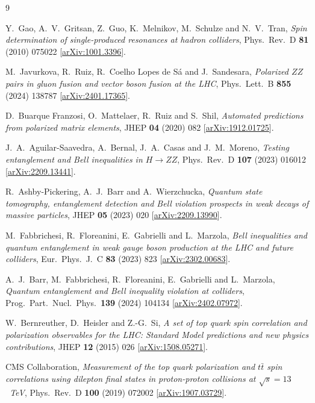 \documentclass[a4paper,11pt]{article}
\begin{document}
\begin{thebibliography}{9}

  Y.~Gao, A.~V.~Gritsan, Z.~Guo, K.~Melnikov, M.~Schulze and N.~V.~Tran,
  \emph{Spin determination of single-produced resonances at hadron colliders},
  Phys.\ Rev.\ D \textbf{81} (2010) 075022
  [\href{https://arxiv.org/abs/1001.3396}{arXiv:1001.3396}].

  M.~Javurkova, R.~Ruiz, R.~Coelho Lopes de S\'a and J.~Sandesara,
  \emph{Polarized $ZZ$ pairs in gluon fusion and vector boson fusion at the LHC},
  Phys.\ Lett.\ B \textbf{855} (2024) 138787
  [\href{https://arxiv.org/abs/2401.17365}{arXiv:2401.17365}].

  D.~Buarque Franzosi, O.~Mattelaer, R.~Ruiz and S.~Shil,
  \emph{Automated predictions from polarized matrix elements},
  JHEP \textbf{04} (2020) 082
  [\href{https://arxiv.org/abs/1912.01725}{arXiv:1912.01725}].

  J.~A.~Aguilar-Saavedra, A.~Bernal, J.~A.~Casas and J.~M.~Moreno,
  \emph{Testing entanglement and Bell inequalities in $H\to ZZ$},
  Phys.\ Rev.\ D \textbf{107} (2023) 016012
  [\href{https://arxiv.org/abs/2209.13441}{arXiv:2209.13441}].

  R.~Ashby-Pickering, A.~J.~Barr and A.~Wierzchucka,
  \emph{Quantum state tomography, entanglement detection and Bell violation
  prospects in weak decays of massive particles},
  JHEP \textbf{05} (2023) 020
  [\href{https://arxiv.org/abs/2209.13990}{arXiv:2209.13990}].

  M.~Fabbrichesi, R.~Floreanini, E.~Gabrielli and L.~Marzola,
  \emph{Bell inequalities and quantum entanglement in weak gauge boson
  production at the LHC and future colliders},
  Eur.\ Phys.\ J.\ C \textbf{83} (2023) 823
  [\href{https://arxiv.org/abs/2302.00683}{arXiv:2302.00683}].

  A.~J.~Barr, M.~Fabbrichesi, R.~Floreanini, E.~Gabrielli and L.~Marzola,
  \emph{Quantum entanglement and Bell inequality violation at colliders},
  Prog.\ Part.\ Nucl.\ Phys.\ \textbf{139} (2024) 104134
  [\href{https://arxiv.org/abs/2402.07972}{arXiv:2402.07972}].

  W.~Bernreuther, D.~Heisler and Z.-G.~Si,
  \emph{A set of top quark spin correlation and polarization observables for
  the LHC: Standard Model predictions and new physics contributions},
  JHEP \textbf{12} (2015) 026
  [\href{https://arxiv.org/abs/1508.05271}{arXiv:1508.05271}].

  CMS Collaboration,
  \emph{Measurement of the top quark polarization and $t\bar t$ spin
  correlations using dilepton final states in proton-proton collisions at
  $\sqrt{s}=13$~TeV},
  Phys.\ Rev.\ D \textbf{100} (2019) 072002
  [\href{https://arxiv.org/abs/1907.03729}{arXiv:1907.03729}].

\end{thebibliography}
\end{document}
